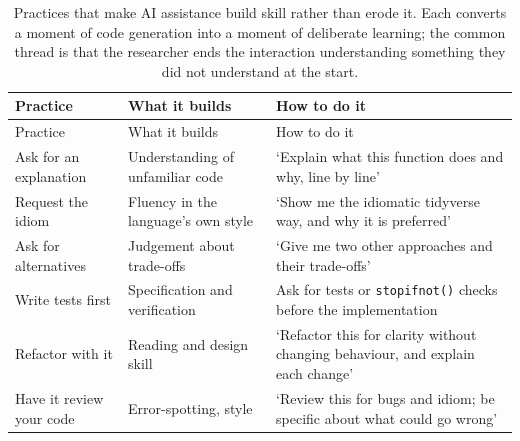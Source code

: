 \documentclass[
  letterpaper,
  11pt]{scrbook}
\begin{document}
\begin{longtable}[]{@{}
  >{\raggedright\arraybackslash}p{}
  >{\raggedright\arraybackslash}p{}
  >{\raggedright\arraybackslash}p{}@{}}
\caption{Practices that make AI assistance build skill rather than erode
it. Each converts a moment of code generation into a moment of
deliberate learning; the common thread is that the researcher ends the
interaction understanding something they did not understand at the
start.}\label{tbl-ai-practices}\tabularnewline
\toprule\noalign{}
\begin{minipage}[b]{\linewidth}\raggedright
Practice
\end{minipage} & \begin{minipage}[b]{\linewidth}\raggedright
What it builds
\end{minipage} & \begin{minipage}[b]{\linewidth}\raggedright
How to do it
\end{minipage} \\
\midrule\noalign{}
\endfirsthead
\toprule\noalign{}
\begin{minipage}[b]{\linewidth}\raggedright
Practice
\end{minipage} & \begin{minipage}[b]{\linewidth}\raggedright
What it builds
\end{minipage} & \begin{minipage}[b]{\linewidth}\raggedright
How to do it
\end{minipage} \\
\midrule\noalign{}
\endhead
\bottomrule\noalign{}
\endlastfoot
Ask for an explanation & Understanding of unfamiliar code & `Explain
what this function does and why, line by line' \\
Request the idiom & Fluency in the language's own style & `Show me the
idiomatic tidyverse way, and why it is preferred' \\
Ask for alternatives & Judgement about trade-offs & `Give me two other
approaches and their trade-offs' \\
Write tests first & Specification and verification & Ask for tests or
\texttt{stopifnot()} checks before the implementation \\
Refactor with it & Reading and design skill & `Refactor this for clarity
without changing behaviour, and explain each change' \\
Have it review your code & Error-spotting, style & `Review this for bugs
and idiom; be specific about what could go wrong' \\
\end{longtable}
\end{document}
